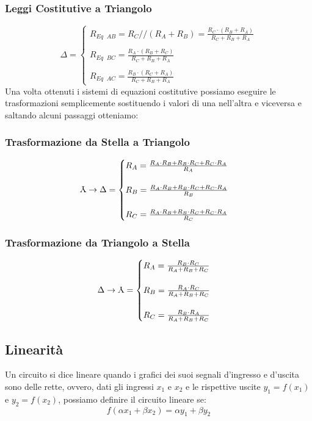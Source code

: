\documentclass[../main.tex]{subfiles}
\begin{document}
	\subsubsection{Leggi Costitutive a Triangolo}
	\[
	\Delta =
	\begin{cases}
		R_{Eq \;\; AB} = R_C // (R_A + R_B)  = \frac{R_C \cdot (R_B + R_A)}{R_C + R_B + R_A}\\\\
		R_{Eq \;\; BC} = \frac{R_A \cdot (R_B + R_C)}{R_C + R_B + R_A} \\\\
		R_{Eq \;\; AC} = \frac{R_B \cdot (R_C + R_A)}{R_C + R_B + R_A}
	\end{cases}
	\]
	Una volta ottenuti i sistemi di equazioni costitutive possiamo eseguire le trasformazioni semplicemente sostituendo i valori di una nell'altra e viceversa e saltando alcuni passaggi otteniamo:
	\subsubsection{Trasformazione da Stella a Triangolo}
	\[
	\rotatebox[origin=c]{180}{Y} \rightarrow \Delta =
	\begin{cases}
		R_A = \frac{R_A \cdot R_B + R_B \cdot R_C + R_C \cdot R_A}{R_A} \\\\
		R_B = \frac{R_A \cdot R_B + R_B \cdot R_C + R_C \cdot R_A}{R_B}\\\\
		R_C = \frac{R_A \cdot R_B + R_B \cdot R_C + R_C \cdot R_A}{R_C}
	\end{cases}
	\]
	\subsubsection{Trasformazione da Triangolo a Stella}
	\[
	\Delta \rightarrow \rotatebox[origin=c]{180}{Y} =
	\begin{cases}
		R_A = \frac{R_B \cdot R_C}{R_A + R_B + R_C} \\\\
		R_B = \frac{R_A \cdot R_C}{R_A + R_B + R_C} \\\\
		R_C = \frac{R_B \cdot R_A}{R_A + R_B + R_C}
	\end{cases}
	\]
	\subsection{Linearità}
	Un circuito si dice lineare quando i grafici dei suoi segnali d’ingresso e d’uscita sono delle rette, ovvero, dati gli ingressi $x_1$ e $x_2$ e le rispettive uscite $y_1 = f(x_1)$ e $y_2 = f(x_2)$, possiamo definire il circuito lineare se:
	\[f(\alpha x_1 + \beta x_2) = \alpha y_1 + \beta y_2\]
\end{document}

